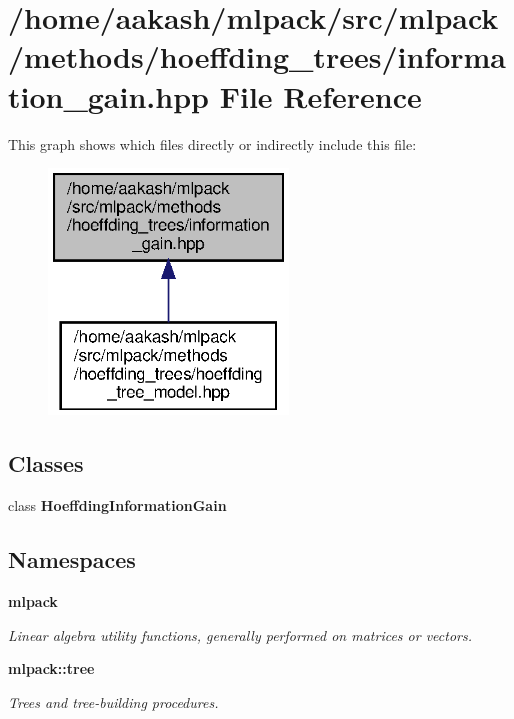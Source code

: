 \section{/home/aakash/mlpack/src/mlpack/methods/hoeffding\+\_\+trees/information\+\_\+gain.hpp File Reference}
\label{hoeffding__trees_2information__gain_8hpp}
This graph shows which files directly or indirectly include this file\+:
\nopagebreak
\begin{figure}[H]
\begin{center}
\leavevmode
\includegraphics[width=181pt]{hoeffding__trees_2information__gain_8hpp__dep__incl}
\end{center}
\end{figure}
\subsection*{Classes}
\begin{DoxyCompactItemize}
\item 
class \textbf{ Hoeffding\+Information\+Gain}
\end{DoxyCompactItemize}
\subsection*{Namespaces}
\begin{DoxyCompactItemize}
\item 
 \textbf{ mlpack}
\begin{DoxyCompactList}\small\item\em Linear algebra utility functions, generally performed on matrices or vectors. \end{DoxyCompactList}\item 
 \textbf{ mlpack\+::tree}
\begin{DoxyCompactList}\small\item\em Trees and tree-\/building procedures. \end{DoxyCompactList}\end{DoxyCompactItemize}


